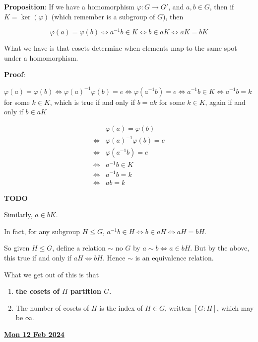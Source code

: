 \documentclass[12pt]{article}
\renewcommand{\date}[1]{\newpage \underline{\bf #1}}
\def\phi{\varphi}
\newcommand{\TODO}{\color{red}\textbf{TODO}\color{black}}
\begin{document}
{\bf Proposition}: If we have a homomorphism $\phi: G \to G'$, and $a, b \in G$,
then if $K = \ker(\phi)$ (which remember is a subgroup of $G$), then

\[
  \phi(a) = \phi(b) \Leftrightarrow a^{-1}b \in K \Leftrightarrow b \in a K
  \Leftrightarrow a K = b K
\]

What we have is that cosets determine when elements map to the same spot under a
homomorphism.

{\bf Proof}:

$\phi(a) = \phi(b) \Leftrightarrow \phi(a)^{-1}\phi(b) = e \Leftrightarrow
\phi(a^{-1}b) = e \Leftrightarrow a^{-1}b \in K \Leftrightarrow a^{-1}b = k$ for
some $k \in K$, which is true if and only if $b = ak$ for some $k \in K$, again
if and only if $b \in a K$

\begin{align*}
  &\phi(a) = \phi(b) \\
  \Leftrightarrow &\phi(a)^{-1}\phi(b) = e \\
  \Leftrightarrow &\phi(a^{-1}b) = e \\
  \Leftrightarrow &a^{-1}b \in K \\
  \Leftrightarrow &a^{-1}b = k \\
  \Leftrightarrow &ab = k
\end{align*}

\TODO {}

Similarly, $a \in bK$.


In fact, for any subgroup $H \le G$, $a^{-1}b \in H \Leftrightarrow b \in aH
\Leftrightarrow aH = bH$.

So given $H \le G$, define a relation $\sim$ no $G$ by $a \sim b \Leftrightarrow
a \in bH$. But by the above, this true if and only if $aH \Leftrightarrow bH$.
Hence $\sim$ is an equivalence relation.

What we get out of this is that

\begin{enumerate}
  \item {\bf the cosets of $H$ partition $G$}.
  \item The number of cosets of $H$ is the index of $H \in G$, written $[G : H]$, which may be $\infty$.
\end{enumerate}

\date{Mon 12 Feb 2024}

\end{document}
